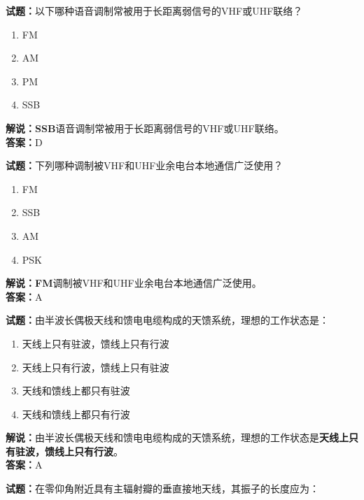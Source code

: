 \documentclass{ctexbook}
\begin{document}
\bigskip


\noindent\textbf{试题：}以下哪种语音调制常被用于长距离弱信号的VHF或UHF联络？

\begin{enumerate}[leftmargin=3em]
	\item FM
	\item AM
	\item PM
	\item SSB
\end{enumerate}

\noindent\textbf{解说：}\textbf{SSB}语音调制常被用于长距离弱信号的VHF或UHF联络。\\\noindent\textbf{答案：}D%


\bigskip


\noindent\textbf{试题：}下列哪种调制被VHF和UHF业余电台本地通信广泛使用？

\begin{enumerate}[leftmargin=3em]
	\item FM
	\item SSB
	\item AM
	\item PSK
\end{enumerate}


\noindent\textbf{解说：}\textbf{FM}调制被VHF和UHF业余电台本地通信广泛使用。\\\noindent\textbf{答案：}A%


\bigskip





\noindent\textbf{试题：}由半波长偶极天线和馈电电缆构成的天馈系统，理想的工作状态是：

\begin{enumerate}[leftmargin=3em]
	\item 天线上只有驻波，馈线上只有行波
	\item 天线上只有行波，馈线上只有驻波
	\item 天线和馈线上都只有驻波
	\item 天线和馈线上都只有行波
\end{enumerate}

\noindent\textbf{解说：}由半波长偶极天线和馈电电缆构成的天馈系统，理想的工作状态是\textbf{天线上只有驻波，馈线上只有行波}。\\\noindent\textbf{答案：}A%


\bigskip


\noindent\textbf{试题：}在零仰角附近具有主辐射瓣的垂直接地天线，其振子的长度应为：
\end{document}
